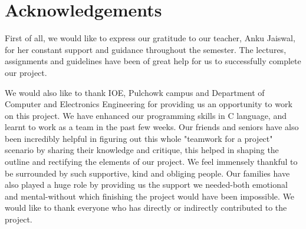 \documentclass[report]{subfiles}
\begin{document}
\chapter*{\centering Acknowledgements}

First of all, we would like to express our gratitude to our teacher, Anku Jaiswal, for her constant support and guidance throughout the semester.
The lectures, assignments and guidelines have been of great help for us to successfully complete our project.

We would also like to thank IOE, Pulchowk campus and Department of Computer and Electronics Engineering for providing us an opportunity to work on this project.
We have enhanced our programming skills in C language, and learnt to work as a team in the past few weeks. Our friends and seniors have also been incredibly helpful in figuring out this whole "teamwork for a project" scenario by sharing their knowledge and critique, this helped in shaping the outline and rectifying the elements of our project. 
We feel immensely thankful to be surrounded by such supportive, kind and obliging people. Our families have also played a huge role by providing us the support we needed-both emotional and mental-without which finishing the project would have been impossible.
We would like to thank everyone who has directly or indirectly contributed to the project.
\end{document}
